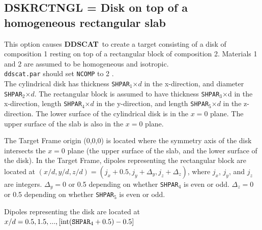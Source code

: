 \subsection{ DSKRCTNGL = Disk on top of a homogeneous rectangular slab
            \label{sec:DSKRCTNGL}}
            This option causes {{\bf DDSCAT}}\ to create a target consisting
	    of a disk of composition 1
	    resting on top of a rectangular block of composition 2.
	    Materials 1 and 2 are assumed to be homogeneous and isotropic.\\
	    {\tt ddscat.par} should set {\tt NCOMP} to 2 .
	    \ \\
	    The cylindrical disk has thickness {\tt SHPAR$_1$}$\times d$ in the
	    x-direction, and diameter {\tt SHPAR$_2$}$\times d$.
	    The rectangular block is assumed to have thickness
	    {\tt SHPAR}$_3$$\times$d in the x-direction, length
	    {\tt SHPAR}$_4$$\times d$ in the y-direction,
	    and length {\tt SHPAR}$_5$$\times d$ in the z-direction.
	    The lower surface of the cylindrical disk is in the $x=0$ plane.
	    The upper surface of the slab is also in the $x=0$ plane.

	    The Target Frame origin (0,0,0) is located where the symmetry
	    axis of the disk intersects the $x=0$ plane (the upper surface
	    of the slab, and the lower surface of the disk).
	    In the Target Frame, 
	    dipoles representing the rectangular block are located at
	    $(x/d,y/d,z/d)=(j_x+0.5,j_y+\Delta_y,j_z+\Delta_z)$, where
	    $j_x$, $j_y$, and $j_z$ are integers. $\Delta_y=0$ or 0.5
	    depending on whether {\tt SHPAR}$_4$ is even or odd.
	    $\Delta_z=0$ or 0.5 depending on whether {\tt SHPAR}$_5$ is
	    even or odd.

            Dipoles representing the disk are located at\\
	    $x/d = 0.5 , 1.5 ,..., 
	    [{\rm int}({\tt SHPAR}_4+0.5)-0.5]$

